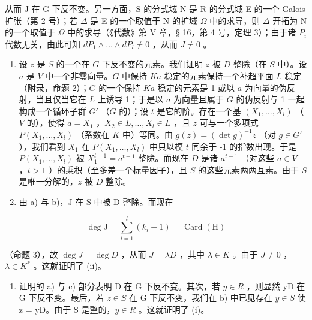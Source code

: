从而 J 在 G 下反不变。另一方面，S 的分式域 N 是 R 的分式域 E 的一个 Galois 扩张（第 2 号）；若 \(\Delta\) 是 E 的一个取值于 N 的扩域 \(\Omega\) 中的求导，则 \(\Delta\) 开拓为 N 的一个取值于 \(\Omega\) 中的求导（《代数》第 V 章，§ 16，第 4 号，定理 3）；由于诸 \(P_{i}\) 代数无关，由此可知 \(dP_{1} \wedge \ldots \wedge dP_{l} \neq 0\) ，从而 \(J \neq 0\) 。

\begin{enumerate}
\def\labelenumi{\alph{enumi})}
\setcounter{enumi}{1}
\item
  设 \(z\) 是 \(S\) 的一个在 \(G\) 下反不变的元素。我们证明 \(z\) 被 \(D\) 整除（在 \(S\) 中）。设 \(a\) 是 \(V\) 中一个非零向量。\(G\) 中保持 \(Ka\) 稳定的元素保持一个补超平面 \(L\) 稳定（附录，命题 2）；\(G\) 的一个保持 \(Ka\) 稳定的元素是 1 或以 \(a\) 为向量的伪反射，当且仅当它在 \(L\) 上诱导 1；于是以 \(a\) 为向量且属于 \(G\) 的伪反射与 1 一起构成一个循环子群 \(G'\) （\(G\) 的）；设 \(t\) 是它的阶。存在一个基 \((X_1, \ldots, X_l)\) （\(V\) 的），使得 \(a = X_1\) ，\(X_2 \in L, \ldots, X_l \in L\) ，且 \(z\) 可与一个多项式 \(P(X_1, \ldots, X_l)\) （系数在 \(K\) 中）等同。由 \(g(z) = (\det g)^{-1}z\) （对 \(g \in G'\) ），我们看到 \(X_1\) 在 \(P(X_1, \ldots, X_l)\) 中只以模 \(t\) 同余于 -1 的指数出现。于是 \(P(X_1, \ldots, X_l)\) 被 \(X_1^{t-1} = a^{t-1}\) 整除。而现在 \(D\) 是诸 \(a^{t-1}\) （对这些 \(a \in V\) ，\(t > 1\) ）的乘积（至多差一个标量因子），且 \(S\) 的这些元素两两互素。由于 \(S\) 是唯一分解的，\(z\) 被 \(D\) 整除。
\item
  由 a) 与 b)，J 在 S 中被 D 整除。而现在
\end{enumerate}

\[
\deg \mathrm{J} = \sum_ {i = 1} ^ {l} (k _ {i} - 1) = \operatorname{Card} (\mathrm{H})
\]

（命题 3），故 \(\deg J = \deg D\) ，从而 \(J = \lambda D\) ，其中 \(\lambda \in K\) 。由于 \(J \neq 0\) ，\(\lambda \in K^*\) 。这就证明了 (ii)。

\begin{enumerate}
\def\labelenumi{\alph{enumi})}
\setcounter{enumi}{3}
\tightlist
\item
  证明的 a) 与 c) 部分表明 D 在 G 下反不变。其次，若 \(y \in R\) ，则显然 yD 在 G 下反不变。最后，若 \(z \in S\) 在 G 下反不变，我们在 b) 中已见存在 \(y \in S\) 使 z = yD。由于 S 是整的，\(y \in R\) 。这就证明了 (i)。
\end{enumerate}
\relax{}
